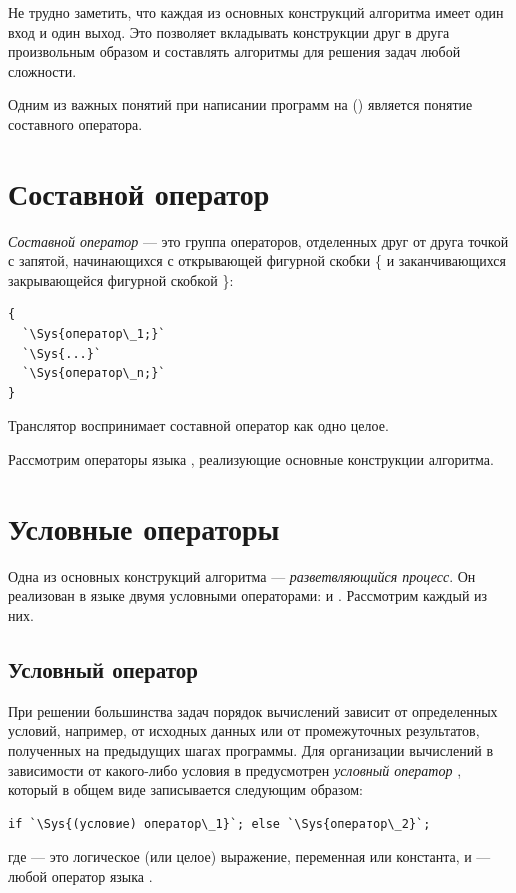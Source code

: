 Не трудно заметить, что каждая из основных конструкций алгоритма имеет один вход и один выход. Это позволяет вкладывать
конструкции друг в друга произвольным образом и составлять алгоритмы для решения задач любой сложности.

Одним из важных понятий при написании программ на () является понятие составного оператора.

\section[Составной оператор]{Составной оператор}
\emph{Составной оператор} --- это группа операторов, отделенных друг от друга
точкой с запятой, начинающихся с открывающей фигурной скобки \{ и заканчивающихся закрывающейся
фигурной скобкой \}:
\begin{lstlisting}
{
  `\Sys{оператор\_1;}`
  `\Sys{...}`
  `\Sys{оператор\_n;}`
}
\end{lstlisting}

Транслятор воспринимает составной оператор как одно целое.

Рассмотрим операторы языка , реализующие основные конструкции алгоритма.

\section[Условные операторы]{Условные операторы}
Одна из основных конструкций алгоритма --- 
\emph{разветвляющийся процесс}. Он реализован в языке
 двумя условными операторами:  и . Рассмотрим каждый из них.

\subsection[Условный оператор]{Условный оператор}
При решении большинства задач порядок вычислений зависит от определенных условий, например, от исходных данных или от
промежуточных результатов, полученных на предыдущих шагах программы. Для организации вычислений в зависимости от
какого-либо условия в  предусмотрен \emph{условный оператор} , 
который в общем виде записывается следующим образом:
\begin{lstlisting}
if `\Sys{(условие) оператор\_1}`; else `\Sys{оператор\_2}`;
\end{lstlisting}
где  --- это логическое (или целое) выражение, переменная или константа, 
 и  --- любой оператор языка .

